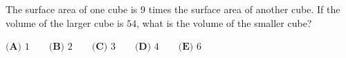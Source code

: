 The surface area of one cube is $9$ times the surface area of another cube. If the volume of the larger cube is $54$, what is the volume of the smaller cube?

$\textbf{(A) }1\qquad\textbf{(B) }2\qquad\textbf{(C) }3\qquad\textbf{(D) }4\qquad\textbf{(E) }6$
